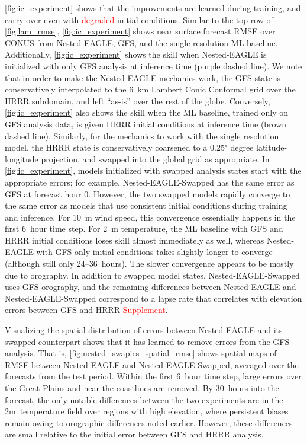 \documentclass[11pt]{article}
\newcommand{\red}[1]{\textcolor{red}{#1}}
\begin{document}
\cref{fig:ic_experiment} shows that the improvements are learned during
training, and carry over even with \red{degraded} initial conditions.
Similar to the top row of \cref{fig:lam_rmse}, \cref{fig:ic_experiment} shows
near surface forecast RMSE over CONUS from Nested-EAGLE, GFS, and
the single resolution ML baseline.
Additionally, \cref{fig:ic_experiment} shows the skill when Nested-EAGLE is
initialized with only GFS analysis at inference time (purple dashed line).
We note that in order to make the Nested-EAGLE mechanics work,
the GFS state is conservatively interpolated to the 6~km Lambert Conic Conformal
grid over the HRRR subdomain, and left ``as-is'' over the rest of the globe.
Conversely, \cref{fig:ic_experiment} also shows the skill when the ML baseline,
trained only on GFS analysis data, is given HRRR initial conditions at
inference time (brown dashed line).
Similarly, for the mechanics to work with the single resolution model,
the HRRR state is conservatively coarsened to a 0.25$^\circ$ degree
latitude-longitude projection, and swapped into the global grid as appropriate.
In \cref{fig:ic_experiment}, models initialized with swapped
analysis states start with the appropriate errors; for example,
Nested-EAGLE-Swapped has the same error as GFS at forecast hour 0.
However, the two swapped models rapidly converge to the
same error as models that use consistent initial conditions during training and inference.
For 10~m wind speed, this convergence essentially happens in the first 6~hour
time step.
For 2~m temperature, the ML baseline with GFS and HRRR initial conditions
loses skill almost immediately as well, whereas Nested-EAGLE with GFS-only
initial conditions takes slightly longer to converge (although still only 24--36~hours).
The slower convergence appears to be mostly due to orography.
In addition to swapped model states, Nested-EAGLE-Swapped
uses GFS orography, and the remaining differences between Nested-EAGLE and
Nested-EAGLE-Swapped correspond to a lapse rate
that correlates with elevation errors between GFS and HRRR \red{Supplement}.


Visualizing the spatial distribution of errors between Nested-EAGLE and
its swapped counterpart shows that it has learned to remove errors from the GFS
analysis.
That is, \cref{fig:nested_swapics_spatial_rmse}
shows spatial maps of RMSE between Nested-EAGLE and Nested-EAGLE-Swapped,
averaged over the forecasts from the test period.
Within the first 6~hour time step, large errors over the Great Plains and near
the coastlines are removed.
By 30~hours into the forecast, the only notable differences between the two
experiments are in the 2m~temperature field over regions with high elevation,
where persistent biases remain owing to orographic differences noted earlier.
However, these differences are small relative to the initial error
between GFS and HRRR analysis.
\end{document}
